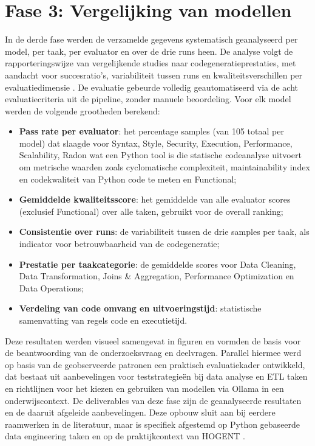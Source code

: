 \section{Fase 3: Vergelijking van modellen}

In de derde fase werden de verzamelde gegevens systematisch geanalyseerd per model, per taak, per evaluator en over de drie runs heen. De analyse volgt de rapporteringswijze van vergelijkende studies naar codegeneratieprestaties, met aandacht voor succesratio's, variabiliteit tussen runs en kwaliteitsverschillen per evaluatiedimensie \autocite{Li2023,Ni2024}. De evaluatie gebeurde volledig geautomatiseerd via de acht evaluatiecriteria uit de pipeline, zonder manuele beoordeling. Voor elk model werden de volgende grootheden berekend:
\begin{itemize}
    \item \textbf{Pass rate per evaluator}: het percentage samples (van 105 totaal per model) dat slaagde voor Syntax, Style, Security, Execution, Performance, Scalability, Radon wat een Python tool is die statische codeanalyse uitvoert om metrische waarden zoals cyclomatische complexiteit, maintainability index en codekwaliteit van Python code te meten en Functional;
    \item \textbf{Gemiddelde kwaliteitsscore}: het gemiddelde van alle evaluator scores (exclusief Functional) over alle taken, gebruikt voor de overall ranking;
    \item \textbf{Consistentie over runs}: de variabiliteit tussen de drie samples per taak, als indicator voor betrouwbaarheid van de codegeneratie;
    \item \textbf{Prestatie per taakcategorie}: de gemiddelde scores voor Data Cleaning, Data Transformation, Joins \& Aggregation, Performance Optimization en Data Operations;
    \item \textbf{Verdeling van code omvang en uitvoeringstijd}: statistische samenvatting van regels code en executietijd.
\end{itemize}

Deze resultaten werden visueel samengevat in figuren en vormden de basis voor de beantwoording van de onderzoeksvraag en deelvragen. Parallel hiermee werd op basis van de geobserveerde patronen een praktisch evaluatiekader ontwikkeld, dat bestaat uit aanbevelingen voor teststrategieën bij data analyse en ETL taken en richtlijnen voor het kiezen en gebruiken van modellen via Ollama in een onderwijscontext. De deliverables van deze fase zijn de geanalyseerde resultaten en de daaruit afgeleide aanbevelingen. Deze opbouw sluit aan bij eerdere raamwerken in de literatuur, maar is specifiek afgestemd op Python gebaseerde data engineering taken en op de praktijkcontext van HOGENT \autocite{LopezEspejel2025}.

